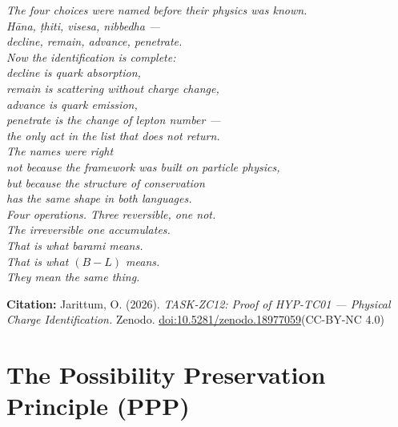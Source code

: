 \documentclass[12pt, a4paper]{article}
\begin{document}
\bigskip
\begin{center}
\textit{
The four choices were named before their physics was known.\\
Hāna, ṭhiti, visesa, nibbedha ---\\
decline, remain, advance, penetrate.\\[0.5em]
Now the identification is complete:\\
decline is quark absorption,\\
remain is scattering without charge change,\\
advance is quark emission,\\
penetrate is the change of lepton number ---\\
the only act in the list that does not return.\\[0.5em]
The names were right\\
not because the framework was built on particle physics,\\
but because the structure of conservation\\
has the same shape in both languages.\\
Four operations. Three reversible, one not.\\
The irreversible one accumulates.\\
That is what barami means.\\
That is what $(B-L)$ means.\\
They mean the same thing.
}
\end{center}

\medskip
\begin{center}
\textbf{Citation:} Jarittum, O. (2026).
\textit{TASK-ZC12: Proof of HYP-TC01 --- Physical Charge Identification.}
Zenodo. \href{https://doi.org/10.5281/zenodo.18977059}%
{doi:10.5281/zenodo.18977059}\quad (CC-BY-NC 4.0)
\end{center}

\bigskip


\section{The Possibility Preservation Principle (PPP)}
\label{sec:ppp}
\end{document}
